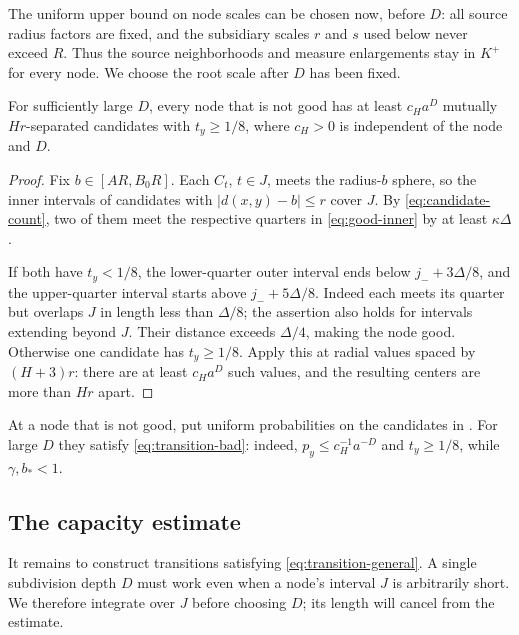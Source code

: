 The uniform upper bound on node scales can be chosen now, before $D$:
all source radius factors are fixed, and the subsidiary scales $r$
and $s$ used below never exceed $R$. Thus the source neighborhoods
and measure enlargements stay in $K^+$ for every node. We choose the
root scale after $D$ has been fixed.

\begin{lemma}
\label{lem:bad-node-children}
For sufficiently large $D$, every node that is not good has at least
$c_Ha^D$ mutually $Hr$-separated candidates with $t_y\geq1/8$,
where $c_H>0$ is independent of the node and $D$.
\end{lemma}
\begin{proof}
Fix $b\in[AR,B_0R]$. Each $C_t$, $t\in J$, meets the radius-$b$
sphere, so the inner intervals of candidates with
$|d(x,y)-b|\leq r$ cover $J$. By \eqref{eq:candidate-count}, two of
them meet the respective quarters in \eqref{eq:good-inner} by at least
$\kappa\Delta$.

If both have $t_y<1/8$, the lower-quarter outer interval ends below
$j_-+3\Delta/8$, and the upper-quarter interval starts above
$j_-+5\Delta/8$. Indeed each meets its quarter but overlaps $J$ in
length less than $\Delta/8$; the assertion also holds for intervals
extending beyond $J$. Their distance exceeds $\Delta/4$, making the
node good. Otherwise one candidate has $t_y\geq1/8$. Apply this at
radial values spaced by $(H+3)r$: there are at least $c_Ha^D$ such
values, and the resulting centers are more than $Hr$ apart.
\end{proof}

At a node that is not good, put uniform probabilities on the
candidates in . For large $D$ they satisfy
\eqref{eq:transition-bad}: indeed, $p_y\le c_H^{-1}a^{-D}$ and
$t_y\ge1/8$, while $\gamma,b_*<1$.

\subsection{The capacity estimate}

It remains to construct transitions satisfying
\eqref{eq:transition-general}. A single subdivision depth $D$ must
work even when a node's interval $J$ is arbitrarily short. We therefore
integrate over $J$ before choosing $D$; its length will cancel from
the estimate.

